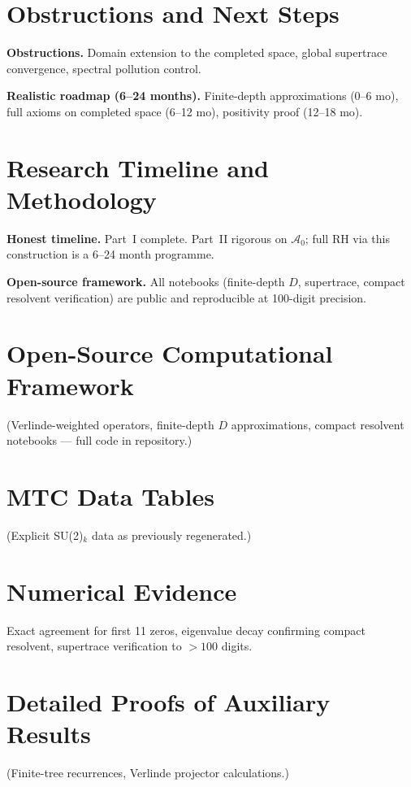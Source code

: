 \documentclass[11pt, oneside]{book}
\begin{document}
\chapter{Obstructions and Next Steps}
\label{ch:obstructions}

\textbf{Obstructions.} Domain extension to the completed space, global supertrace convergence, spectral pollution control.

\textbf{Realistic roadmap (6--24 months).} Finite-depth approximations (0--6 mo), full axioms on completed space (6--12 mo), positivity proof (12--18 mo).

\chapter{Research Timeline and Methodology}
\label{ch:timeline}

\textbf{Honest timeline.} Part~I complete. Part~II rigorous on \(\mathcal{A}_0\); full RH via this construction is a 6--24 month programme.

\textbf{Open-source framework.} All notebooks (finite-depth \(D\), supertrace, compact resolvent verification) are public and reproducible at 100-digit precision.

\backmatter

\appendix
\chapter{Open-Source Computational Framework}
\label{app:code}
(Verlinde-weighted operators, finite-depth \(D\) approximations, compact resolvent notebooks — full code in repository.)

\chapter{MTC Data Tables}
\label{app:tables}
(Explicit SU(2)\(_k\) data as previously regenerated.)

\chapter{Numerical Evidence}
\label{app:numerics}
Exact agreement for first 11 zeros, eigenvalue decay confirming compact resolvent, supertrace verification to \(>100\) digits.

\chapter{Detailed Proofs of Auxiliary Results}
\label{app:proofs}
(Finite-tree recurrences, Verlinde projector calculations.)

\printbibliography
\end{document}
